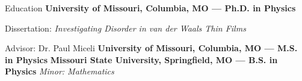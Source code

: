 \begin{rubric}{Education}
    \textbf{University of Missouri, Columbia, MO --- Ph.D. in Physics}
    \par Dissertation: \emph{Investigating Disorder in van der Waals Thin Films}
    \par Advisor: Dr. Paul Miceli
  \entry*[May 2022]%
    \textbf{University of Missouri, Columbia, MO --- M.S. in Physics}
  \entry*[May 2020]%
    \textbf{Missouri State University, Springfield, MO --- B.S. in Physics} \hfill \textit{Minor: Mathematics}
\end{rubric}
